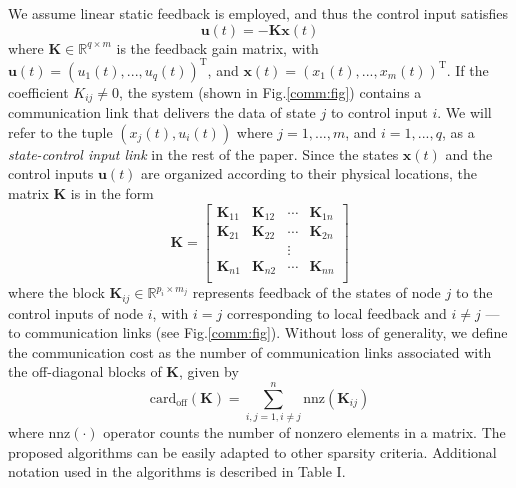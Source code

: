 \documentclass[12pt, draftclsnofoot,onecolumn]{IEEEtran}
\begin{document}
We assume linear static feedback is employed, and thus the control input satisfies
\begin{equation}
{\boldsymbol u}(t) = -{\boldsymbol K}\boldsymbol{x}(t)
\label{feedback:eq}
\end{equation}
\noindent where ${\boldsymbol K}\in {\mathbb R}^{q\times m}$ is the feedback gain matrix, with $\boldsymbol{u}(t) = (u_1(t),...,u_q(t))^{\mathrm{T}}$, and $\boldsymbol{x}(t) = (x_1(t),...,x_m(t))^{\mathrm{T}}$. If the coefficient $K_{ij}\neq 0$, the system (shown in Fig.\ref{comm:fig}) contains a communication link that delivers the data of state $j$ to control input $i$. We will refer to the tuple $(x_j(t), u_i(t))$ where $j=1,...,m$, and $i=1,...,q$, as a
{\it state-control input link} in the rest of the paper. Since the states ${\boldsymbol x}(t)$ and the control inputs ${\boldsymbol u}(t)$ are organized according to their physical locations, the matrix $\boldsymbol K$ is in the form
\begin{equation}
\boldsymbol K=\begin{bmatrix}{\boldsymbol K}_{11} & {\boldsymbol K}_{12} & \cdots& {\boldsymbol K}_{1n}\\
					{\boldsymbol K}_{21} & {\boldsymbol K}_{22} & \cdots & {\boldsymbol K}_{2n}\\
					~ & ~ & \vdots & ~\\
					{\boldsymbol K}_{n1} & {\boldsymbol K}_{n2} & \cdots & {\boldsymbol K}_{nn}\\
	\end{bmatrix}
	\label{Kblock:eq}
\end{equation}
where the block ${\boldsymbol K}_{ij}\in \mathbb{R}^{p_i\times m_j}$ represents feedback of the states of node $j$ to the control inputs of node $i$, with $i=j$ corresponding to local feedback and $i\neq j$ --- to communication links (see Fig.\ref{comm:fig}). Without loss of generality, we define the communication cost as the number of communication links associated with the off-diagonal blocks of ${\boldsymbol K}$, given by
\begin{equation}
\mathrm{card}_{\mathrm{off}}({\boldsymbol K})=\sum_{i,j=1,i\neq j}^{n}{\mathrm{nnz}({\boldsymbol K}_{ij})}
\label{cardoff:eq}
\end{equation}
\noindent where $\mathrm{nnz}(\cdot)$ operator counts the number of nonzero elements in a matrix. The proposed algorithms can be easily adapted to other sparsity criteria. Additional notation used in the algorithms is described in Table I.
\end{document}
